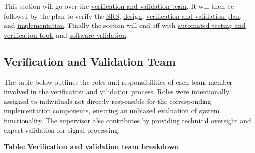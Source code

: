 \documentclass[12pt, titlepage]{article}
\begin{document}
This section will go over the \hyperref[sec:vnv_team]{verification and
validation team}. It will then be followed by the plan to verify the
\hyperref[sec:srs_verification]{SRS},
\hyperref[sec:design_verification]{design},
\hyperref[sec:vnv_plan_verification]{verification and validation plan}, and
\hyperref[sec:implementation_verification]{implementation}. Finally the section
will end off with \hyperref[sec:testing_tools]{automated testing and
verification tools} and \hyperref[sec:software_validation]{software validation}.

\subsection{Verification and Validation Team}\label{sec:vnv_team}

The table below outlines the roles and responsibilities of each team member
involved in the verification and validation process. Roles were intentionally
assigned to individuals not directly responsible for the corresponding
implementation components, ensuring an unbiased evaluation of system
functionality. The supervisor also contributes by providing technical oversight
and expert validation for signal processing.

\noindent
\textbf{Table: Verification and validation team breakdown}
\label{table:vnv_team}
\end{document}

